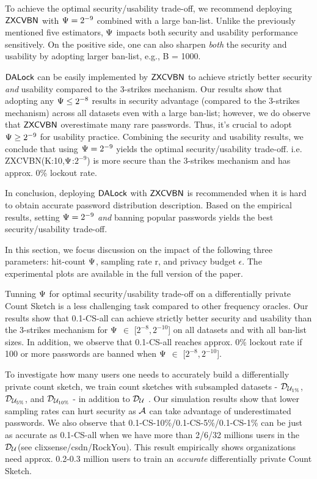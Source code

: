  To achieve the optimal security/usability trade-off, we recommend deploying $\mathsf{ZXCVBN}$ with $\Psi =2^{-9}$ combined with a large ban-list. Unlike the previously mentioned five estimators, $\Psi$ impacts both security and usability performance sensitively. On the positive side, one can also sharpen \textit{both} the security and usability by adopting larger ban-list, e.g., B = 1000.

$\mathsf{DALock}$ can be easily implemented by $\mathsf{ZXCVBN}$ to achieve strictly better security \textit{and} usability compared to the 3-strikes mechanism. Our results show that adopting any $\Psi \le 2^{-8}$ results in security advantage (compared to the 3-strikes mechanism) across all datasets even with a large ban-list; however, we do observe that $\mathsf{ZXCVBN}$ overestimate many rare passwords. Thus, it's crucial to adopt $\Psi \ge 2^{-9}$ for usability practice. Combining the security and usability results, we conclude that using $\Psi = 2^{-9}$ yields the optimal security/usability trade-off. i.e. ZXCVBN(K:10,$\Psi$:$2^{-9}$) is more secure than the 3-strikes mechanism and has approx. 0\% lockout rate.

In conclusion, deploying $\mathsf{DALock}$ with $\mathsf{ZXCVBN}$ is recommended when it is hard to obtain accurate password distribution description. Based on the empirical results, setting $\Psi = 2^{-9}$ \textit{and} banning popular passwords yields the best security/usability trade-off.


 In this section, we focus discussion on the impact of the following three parameters: hit-count $\Psi$, sampling rate r, and privacy budget $\epsilon$. The experimental plots are available in the full version of the paper.

Tunning $\Psi$ for optimal security/usability trade-off on a differentially private Count Sketch is a less challenging task compared to other frequency oracles. Our results show that 0.1-CS-all can achieve strictly better security and usability than the 3-strikes mechanism for $\Psi$ $\in$ [$2^{-8},2^{-10}$] on all datasets and with all ban-list sizes. In addition, we observe that 0.1-CS-all reaches approx. 0\% lockout rate if 100 or more passwords are banned when $\Psi$ $\in$ [$2^{-8},2^{-10}$]. 

To investigate how many users one needs to accurately build a differentially private count sketch, we train count sketches with subsampled datasets - $\mathcal{D}_{{\mathcal{U}_{1\%}}}$, $\mathcal{D}_{{\mathcal{U}_{5\%}}}$, and $\mathcal{D}_{{\mathcal{U}_{10\%}}}$ - in addition to $\mathcal{D}_{{\mathcal{U}}}$ . Our simulation results show that lower sampling rates can hurt security as $\mathcal{A}$ can take advantage of underestimated passwords. We also observe that  0.1-CS-10\%/0.1-CS-5\%/0.1-CS-1\% can be just as accurate as 0.1-CS-all when we have more than 2/6/32 millions users in the $\mathcal{D}_{{\mathcal{U}}}$(see clixsense/csdn/RockYou). This result empirically shows organizations need approx. 0.2-0.3 million users to train an \textit{accurate} differentially private Count Sketch. 

